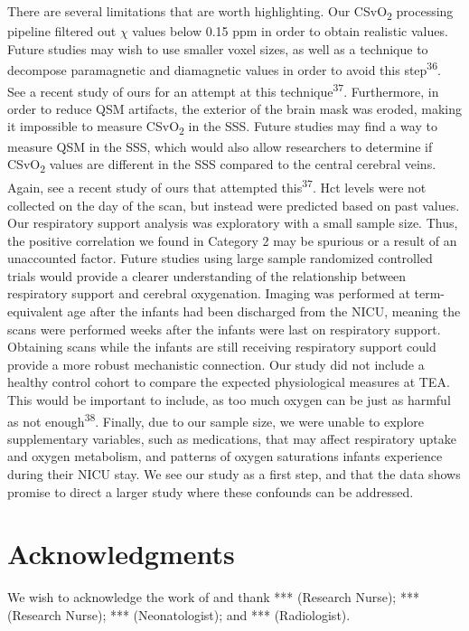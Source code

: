 \documentclass[
  letterpaper,
  DIV=11,
  numbers=noendperiod]{scrartcl}
\begin{document}
There are several limitations that are worth highlighting. Our
CSvO\textsubscript{2} processing pipeline filtered out \(\chi\) values
below 0.15 ppm in order to obtain realistic values. Future studies may
wish to use smaller voxel sizes, as well as a technique to decompose
paramagnetic and diamagnetic values in order to avoid this
step\textsuperscript{36}. See a recent study of ours for an attempt at
this technique\textsuperscript{37}. Furthermore, in order to reduce QSM
artifacts, the exterior of the brain mask was eroded, making it
impossible to measure CSvO\textsubscript{2} in the SSS. Future studies
may find a way to measure QSM in the SSS, which would also allow
researchers to determine if CSvO\textsubscript{2} values are different
in the SSS compared to the central cerebral veins. Again, see a recent
study of ours that attempted this\textsuperscript{37}. Hct levels were
not collected on the day of the scan, but instead were predicted based
on past values. Our respiratory support analysis was exploratory with a
small sample size. Thus, the positive correlation we found in Category 2
may be spurious or a result of an unaccounted factor. Future studies
using large sample randomized controlled trials would provide a clearer
understanding of the relationship between respiratory support and
cerebral oxygenation. Imaging was performed at term-equivalent age after
the infants had been discharged from the NICU, meaning the scans were
performed weeks after the infants were last on respiratory support.
Obtaining scans while the infants are still receiving respiratory
support could provide a more robust mechanistic connection. Our study
did not include a healthy control cohort to compare the expected
physiological measures at TEA. This would be important to include, as
too much oxygen can be just as harmful as not
enough\textsuperscript{38}. Finally, due to our sample size, we were
unable to explore supplementary variables, such as medications, that may
affect respiratory uptake and oxygen metabolism, and patterns of oxygen
saturations infants experience during their NICU stay. We see our study
as a first step, and that the data shows promise to direct a larger
study where these confounds can be addressed.

\section{Acknowledgments}\label{acknowledgments}

We wish to acknowledge the work of and thank *** (Research Nurse); ***
(Research Nurse); *** (Neonatologist); and *** (Radiologist).
\end{document}

